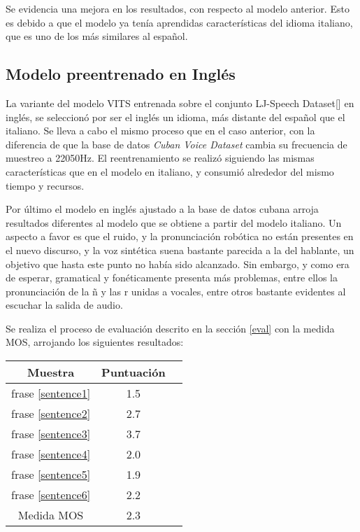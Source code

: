 Se evidencia una mejora en los resultados, con respecto al modelo anterior. Esto es debido a que el modelo ya tenía aprendidas características del idioma italiano, que es uno de los más similares al español.


\subsection{Modelo preentrenado en Inglés} 
La variante del modelo VITS entrenada sobre el conjunto LJ-Speech Dataset[\cite{ljspeech}] en inglés, se seleccionó por ser el inglés un idioma, más distante del español que el italiano. Se lleva a cabo el mismo proceso que en el caso anterior, con la diferencia de que la base de datos \textit{Cuban Voice Dataset} cambia su frecuencia de muestreo a 22050Hz. 
El reentrenamiento se realizó siguiendo las mismas características que en el modelo en italiano, y consumió alrededor del mismo tiempo y recursos.

Por último el modelo en inglés ajustado a la base de datos cubana arroja resultados diferentes al modelo que se obtiene a partir del modelo italiano. Un aspecto a favor es que el ruido, y la pronunciación robótica no están presentes en el nuevo discurso, y la voz sintética suena bastante parecida a la del hablante, un objetivo que hasta este punto no había sido alcanzado. Sin embargo, y como era de esperar, gramatical y fonéticamente presenta más problemas, entre ellos la pronunciación de la ñ y las r unidas a vocales, entre otros bastante evidentes al escuchar la salida de audio.

Se realiza el proceso de evaluación descrito en la sección \ref{eval} con la medida MOS, arrojando los siguientes resultados:

\begin{center} \begin{tabular}{ |c|c|c| } 
		\hline 
		Muestra & Puntuación \\
		\hline
		frase \ref{sentence1} & 1.5 \\
		frase \ref{sentence2} & 2.7 \\
		frase \ref{sentence3} & 3.7 \\
		frase \ref{sentence4} & 2.0 \\
		frase \ref{sentence5} & 1.9 \\
		frase \ref{sentence6} & 2.2 \\
		\hline
		Medida MOS & 2.3\\
		\hline 
	\end{tabular} 
\end{center}


